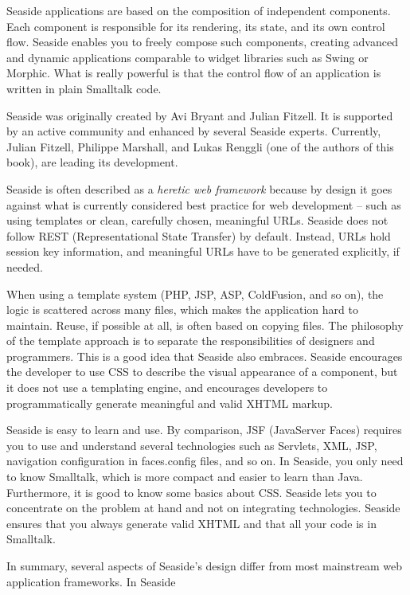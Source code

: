 \documentclass[a4paper,10pt,twoside]{book}
\newcommand{\ct}[1]{{\small\ttfamily\textup{#1}}}
\begin{document}
Seaside applications are based on the composition of independent components. Each component is responsible for its rendering, its state, and its own control flow. Seaside enables you to freely compose such components, creating advanced and dynamic applications comparable to widget libraries such as Swing or Morphic. What is really powerful is that the control flow of an application is written in plain Smalltalk code.

    Seaside was originally created by Avi Bryant and Julian Fitzell. It is supported by an active community and enhanced by several Seaside experts. Currently, Julian Fitzell, Philippe Marshall, and Lukas Renggli (one of the authors of this book), are leading its development.

Seaside is often described as a \textit{heretic web framework} because by design it goes against what is currently considered best practice for web development -- such as using templates or clean, carefully chosen, meaningful URLs. Seaside does not follow REST (Representational State Transfer) by default. Instead, URLs hold session key information, and meaningful URLs have to be generated explicitly, if needed.

When using a template system (PHP, JSP, ASP, ColdFusion, and so on), the logic is scattered across many files, which makes the application hard to maintain. Reuse, if possible at all, is often based on copying files. The philosophy of the template approach is to separate the responsibilities of designers and programmers. This is a good idea that Seaside also embraces. Seaside encourages the developer to use CSS to describe the visual appearance of a component, but it does not use a templating engine, and encourages developers to programmatically generate meaningful and valid XHTML markup.

Seaside is easy to learn and use. By comparison, JSF (JavaServer Faces) requires you to use and understand several technologies such as Servlets, XML, JSP, navigation configuration in \ct{faces.config} files, and so on. In Seaside, you only need to know Smalltalk, which is more compact and easier to learn than Java. Furthermore, it is good to know some basics about CSS. Seaside lets you to concentrate on the problem at hand and not on integrating technologies. Seaside ensures that you always generate valid XHTML and that all your code is in Smalltalk.

In summary, several aspects of Seaside's design differ from most mainstream web application frameworks. In Seaside
\end{document}
